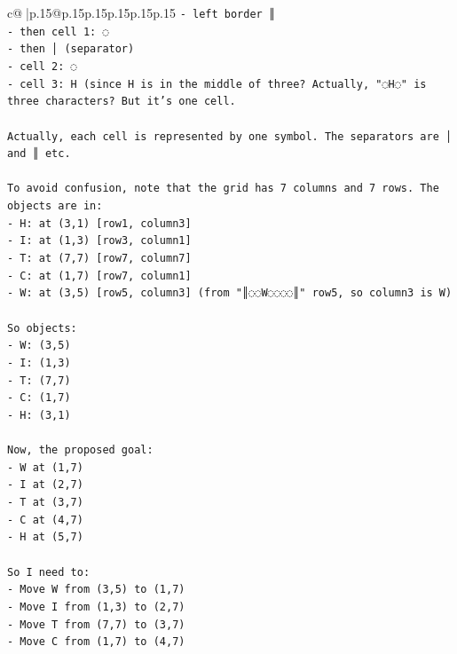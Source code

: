 \documentclass{article}
\begin{document}
{\begin{supertabular}{c@{$\;$}|p{.15\linewidth}@{}p{.15\linewidth}p{.15\linewidth}p{.15\linewidth}p{.15\linewidth}p{.15\linewidth}}
{{{\texttt{{-} left border ║} \\
\texttt{{-} then cell 1: ◌} \\
\texttt{{-} then │ (separator)} \\
\texttt{{-} cell 2: ◌} \\
\texttt{{-} cell 3: H (since H is in the middle of three? Actually, "◌H◌" is three characters? But it's one cell.} \\
\\ 
\texttt{Actually, each cell is represented by one symbol. The separators are │ and ║ etc.} \\
\\ 
\texttt{To avoid confusion, note that the grid has 7 columns and 7 rows. The objects are in:} \\
\texttt{{-} H: at (3,1) {[}row1, column3{]}} \\
\texttt{{-} I: at (1,3) {[}row3, column1{]}} \\
\texttt{{-} T: at (7,7) {[}row7, column7{]}} \\
\texttt{{-} C: at (1,7) {[}row7, column1{]}} \\
\texttt{{-} W: at (3,5) {[}row5, column3{]} (from "║◌◌W◌◌◌◌║" row5, so column3 is W)} \\
\\ 
\texttt{So objects:} \\
\texttt{{-} W: (3,5)} \\
\texttt{{-} I: (1,3)} \\
\texttt{{-} T: (7,7)} \\
\texttt{{-} C: (1,7)} \\
\texttt{{-} H: (3,1)} \\
\\ 
\texttt{Now, the proposed goal:} \\
\texttt{{-} W at (1,7)} \\
\texttt{{-} I at (2,7)} \\
\texttt{{-} T at (3,7)} \\
\texttt{{-} C at (4,7)} \\
\texttt{{-} H at (5,7)} \\
\\ 
\texttt{So I need to:} \\
\texttt{{-} Move W from (3,5) to (1,7)} \\
\texttt{{-} Move I from (1,3) to (2,7)} \\
\texttt{{-} Move T from (7,7) to (3,7)} \\
\texttt{{-} Move C from (1,7) to (4,7)} \\
}}}
\end{supertabular}}
\end{document}
